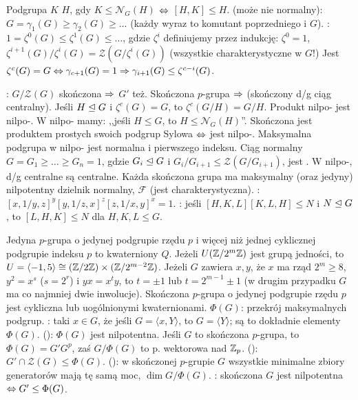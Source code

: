 Podgrupa  $K$  $H$, gdy $K \le \mathcal N_G(H)$ $\Leftrightarrow$ $[H, K] \le H$.
 (może nie normalny): $G = \gamma_1(G) \ge \gamma_2 (G) \ge \ldots$ (każdy wyraz to komutant poprzedniego i $G$).
: $1 = \zeta^0(G) \le \zeta^1(G) \le \ldots$, gdzie  $\zeta^i$ definiujemy przez indukcję: $\zeta^0 = 1$, $\zeta^{i+1}(G) / \zeta^i(G) = \mathcal Z(G / \zeta^i(G))$ (wszystkie charakterystyczne w $G$!)
Jest $\zeta^c(G) = G \Leftrightarrow \gamma_{c+1} (G) = 1 \Rightarrow \gamma_{i+1}(G) \le \zeta^{c-i}(G)$.

: $G / \mathcal Z(G)$ skończona $\Rightarrow$ $G'$ też.
Skończona $p$-grupa $\Rightarrow$  (skończony d/g ciąg  centralny). %
Jeśli $H \trianglelefteq G$ i $\zeta^c(G) = G$, to $\zeta^c(G/H) = G/H$.
Produkt nilpo- jest nilpo-.
W nilpo- mamy: ,,jeśli $H \le G$, to $H \le \mathcal N_G(H)$''.
Skończona jest produktem prostych swoich podgrup Sylowa $\Leftrightarrow$ jest nilpo-.
Maksymalna podgrupa w nilpo- jest normalna i pierwszego indeksu.
Ciąg normalny $G = G_1 \ge \ldots \ge G_n = 1$, gdzie $G_i \trianglelefteq G$ i $G_i / G_{i+1} \le \mathcal Z(G/ G_{i+1})$, jest .
W nilpo-, d/g centralne są centralne.
Każda skończona grupa ma  maksymalny (oraz jedyny) nilpotentny dzielnik normalny,  $\mathscr F$ (jest charakterystyczna).
: $[x,1/y,z]^y [y,1/z,x]^z [z, 1/x, y]^x= 1$.
: jeśli $[H,K,L][K,L,H] \le N$ i $N \trianglelefteq G$, to $[L,H,K] \le N$ dla $H, K, L \le G$.

Jedyna  $p$-grupa o jedynej podgrupie rzędu $p$ i więcej niż jednej cyklicznej podgrupie indeksu $p$ to kwaterniony $Q$.
Jeżeli $U(\mathbb{Z}/2^m\mathbb{Z})$ jest grupą jedności, to $U = \langle -1, 5 \rangle \cong (\mathbb{Z}/2\mathbb{Z}) \times (\mathbb{Z}/2^{m-2}\mathbb{Z})$.
Jeżeli $G$ zawiera $x, y$, że $x$ ma rząd $2^m \ge 8$, $y^2 = x^s$ ($s = 2^r$) i $yx = x^ty$, to $t = \pm 1$ lub $t = 2^{m-1} \pm 1$ (w drugim przypadku $G$ ma co najmniej dwie inwolucje).
Skończona $p$-grupa o jedynej podgrupie rzędu $p$ jest cykliczna lub uogólnionymi kwaternionami.
 $\Phi(G)$: przekrój maksymalnych podgrup.
: taki $x \in G$, że jeśli $G = \langle x, Y\rangle$, to $G = \langle Y \rangle$; są to dokładnie elementy $\Phi(G)$.
 (): $\Phi(G)$ jest nilpotentna.
Jeśli $G$ to skończona $p$-grupa, to $\Phi(G) = G'G^p$, zaś $G/\Phi(G)$ to p. wektorowa nad $\mathbb{Z}_p$.
 (): $G' \cap \mathcal Z(G) \le \Phi(G)$.
 (): w skończonej $p$-grupie $G$ wszystkie minimalne zbiory generatorów mają tę samą moc, $\operatorname{dim} G / \Phi(G)$.
: skończona $G$ jest nilpotentna $\Leftrightarrow G' \le \Phi(G)$.
